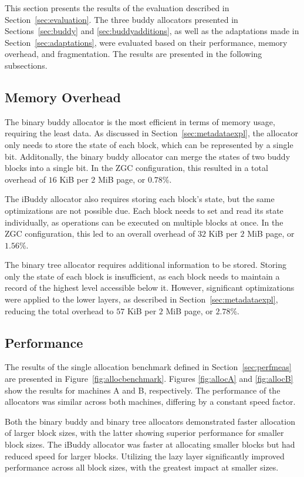 This section presents the results of the evaluation described in Section~\ref{sec:evaluation}. The three buddy allocators presented in Sections~\ref{sec:buddy} and \ref{sec:buddyadditions}, as well as the adaptations made in Section~\ref{sec:adaptations}, were evaluated based on their performance, memory overhead, and fragmentation. The results are presented in the following subsections.

\subsection{Memory Overhead}
The binary buddy allocator is the most efficient in terms of memory usage, requiring the least data. As discussed in Section~\ref{sec:metadataexpl}, the allocator only needs to store the state of each block, which can be represented by a single bit. Additonally, the binary buddy allocator can merge the states of two buddy blocks into a single bit. In the ZGC configuration, this resulted in a total overhead of $16$ KiB per $2$ MiB page, or $0.78$\%.

The iBuddy allocator also requires storing each block's state, but the same optimizations are not possible due. Each block needs to set and read its state individually, as operations can be executed on multiple blocks at once. In the ZGC configuration, this led to an overall overhead of $32$ KiB per $2$ MiB page, or $1.56$\%.

The binary tree allocator requires additional information to be stored. Storing only the state of each block is insufficient, as each block needs to maintain a record of the highest level accessible below it. However, significant optimizations were applied to the lower layers, as described in Section~\ref{sec:metadataexpl}, reducing the total overhead to $57$ KiB per $2$ MiB page, or $2.78$\%.

\subsection{Performance}
The results of the single allocation benchmark defined in Section~\ref{sec:perfmeas} are presented in Figure~\ref{fig:allocbenchmark}. Figures \ref{fig:allocA} and \ref{fig:allocB} show the results for machines A and B, respectively. The performance of the allocators was similar across both machines, differing by a constant speed factor.

Both the binary buddy and binary tree allocators demonstrated faster allocation of larger block sizes, with the latter showing superior performance for smaller block sizes. The iBuddy allocator was faster at allocating smaller blocks but had reduced speed for larger blocks. Utilizing the lazy layer significantly improved performance across all block sizes, with the greatest impact at smaller sizes.

